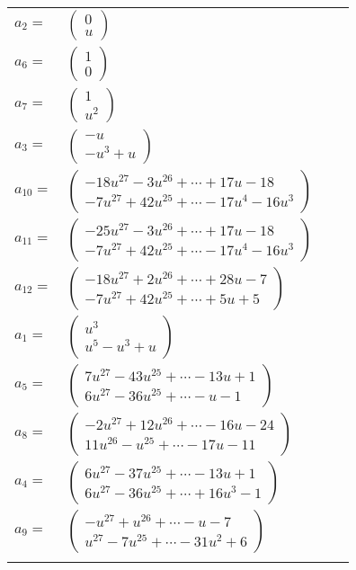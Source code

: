 \documentclass[1p]{elsarticle_modified}
\theoremstyle{definition}
\begin{document}
\begin{tabular}{m{7pt} m{180pt} m{7pt} m{180pt} }
\flushright $a_{2}=$&$\begin{pmatrix}0\\u\end{pmatrix}$ \\
\flushright $a_{6}=$&$\begin{pmatrix}1\\0\end{pmatrix}$ \\
\flushright $a_{7}=$&$\begin{pmatrix}1\\u^2\end{pmatrix}$ \\
\flushright $a_{3}=$&$\begin{pmatrix}- u\\- u^3+u\end{pmatrix}$ \\
\flushright $a_{10}=$&$\begin{pmatrix}-18 u^{27}-3 u^{26}+\cdots+17 u-18\\-7 u^{27}+42 u^{25}+\cdots-17 u^4-16 u^3\end{pmatrix}$ \\
\flushright $a_{11}=$&$\begin{pmatrix}-25 u^{27}-3 u^{26}+\cdots+17 u-18\\-7 u^{27}+42 u^{25}+\cdots-17 u^4-16 u^3\end{pmatrix}$ \\
\flushright $a_{12}=$&$\begin{pmatrix}-18 u^{27}+2 u^{26}+\cdots+28 u-7\\-7 u^{27}+42 u^{25}+\cdots+5 u+5\end{pmatrix}$ \\
\flushright $a_{1}=$&$\begin{pmatrix}u^3\\u^5- u^3+u\end{pmatrix}$ \\
\flushright $a_{5}=$&$\begin{pmatrix}7 u^{27}-43 u^{25}+\cdots-13 u+1\\6 u^{27}-36 u^{25}+\cdots- u-1\end{pmatrix}$ \\
\flushright $a_{8}=$&$\begin{pmatrix}-2 u^{27}+12 u^{26}+\cdots-16 u-24\\11 u^{26}- u^{25}+\cdots-17 u-11\end{pmatrix}$ \\
\flushright $a_{4}=$&$\begin{pmatrix}6 u^{27}-37 u^{25}+\cdots-13 u+1\\6 u^{27}-36 u^{25}+\cdots+16 u^3-1\end{pmatrix}$ \\
\flushright $a_{9}=$&$\begin{pmatrix}- u^{27}+u^{26}+\cdots- u-7\\u^{27}-7 u^{25}+\cdots-31 u^2+6\end{pmatrix}$\\&\end{tabular}
\end{document}
